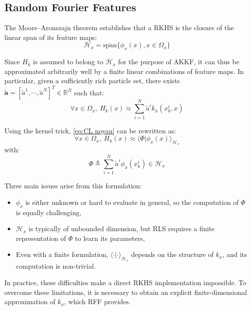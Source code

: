 \documentclass[conference]{IEEEtran}
\begin{document}
\subsection{Random Fourier Features}

The Moore–Aronszajn theorem \cite{bib:Aronszajn} establishes that a RKHS is the closure of the linear span of its feature maps:
\begin{equation}
\mathcal{H}_x=\overline{\text{span}}\{\phi_x(x),x\in\Omega_x\}
\end{equation}

Since $H_k$ is assumed to belong to $\mathcal{H}_x$ for the purpose of AKKF, it can thus be approximated arbitrarily well by a finite linear combinations of feature maps. In particular, given a sufficiently rich particle set, there exists $\tilde{\textbf{a}}=[\tilde{a}^1,\cdots,\tilde{a}^N]^T\in\mathbb{R}^N$ such that:
\begin{equation}
\forall x\in\Omega_x,\:H_k(x)\approx\sum_{i=1}^N\tilde{a}^ik_x(x_k^i,x)\label{eq:CL noyau}
\end{equation}

Using the kernel trick, \eqref{eq:CL noyau} can be rewritten as:
\begin{equation}
\forall x\in\Omega_x,\:H_k(x)\approx\langle\Phi|\phi_x(x)\rangle_{\mathcal{H}_x}
\end{equation}
with:
\begin{equation}
\Phi\triangleq\sum_{i=1}^N\tilde{a}^i\phi_x(x_k^i)\in\mathcal{H}_x
\end{equation}

Three main issues arise from this formulation:
\begin{itemize}
\item $\phi_x$ is either unknown or hard to evaluate in general, so the computation of $\Phi$ is equally challenging,
\item $\mathcal{H}_x$ is typically of unbounded dimension, but RLS requires a finite representation of $\Phi$ to learn its parameters,
\item Even with a finite formulation, $\langle\cdot|\cdot\rangle_{\mathcal{H}_x}$ depends on the structure of $k_x$, and its computation is non-trivial.
\end{itemize}

In practice, these difficulties make a direct RKHS implementation impossible. To overcome these limitations, it is necessary to obtain an explicit finite-dimensional approximation of $k_x$, which RFF provides.
\end{document}

